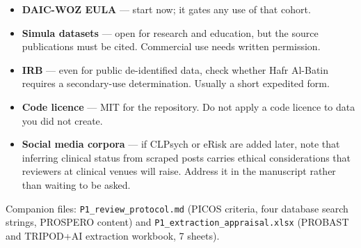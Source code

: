 \documentclass[11pt,a4paper]{article}
\begin{document}
\begin{itemize}
  \item \textbf{DAIC-WOZ EULA} --- start now; it gates any use of that cohort.
  \item \textbf{Simula datasets} --- open for research and education, but the
        source publications must be cited. Commercial use needs written
        permission.
  \item \textbf{IRB} --- even for public de-identified data, check whether
        Hafr Al-Batin requires a secondary-use determination. Usually a short
        expedited form.
  \item \textbf{Code licence} --- MIT for the repository. Do not apply a code
        licence to data you did not create.
  \item \textbf{Social media corpora} --- if CLPsych or eRisk are added later,
        note that inferring clinical status from scraped posts carries ethical
        considerations that reviewers at clinical venues will raise. Address
        it in the manuscript rather than waiting to be asked.
\end{itemize}

\vspace{1em}
{\footnotesize\color{softgrey}
Companion files: \texttt{P1\_review\_protocol.md} (PICOS criteria, four
database search strings, PROSPERO content) and
\texttt{P1\_extraction\_appraisal.xlsx} (PROBAST and TRIPOD+AI extraction
workbook, 7 sheets).\par}
\end{document}
